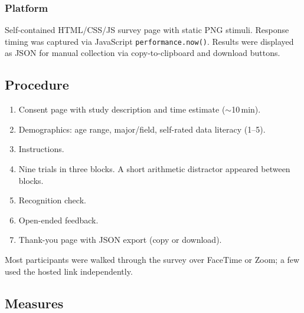\documentclass{article}
\begin{document}
\subsubsection*{Platform}

Self-contained HTML/CSS/JS survey page with static PNG stimuli.
Response timing was captured via JavaScript
\texttt{performance.now()}.  Results were displayed as JSON for manual
collection via copy-to-clipboard and download buttons.

\subsection{Procedure}

\begin{enumerate}[leftmargin=*, itemsep=4pt]
\item Consent page with study description and time estimate
  ($\sim$10\,min).
\item Demographics: age range, major/field, self-rated data literacy
  (1--5).
\item Instructions.
\item Nine trials in three blocks.  A short arithmetic distractor
  appeared between blocks.
\item Recognition check.
\item Open-ended feedback.
\item Thank-you page with JSON export (copy or download).
\end{enumerate}

Most participants were walked through the survey over FaceTime or Zoom;
a few used the hosted link independently.

\subsection{Measures}
\end{document}
